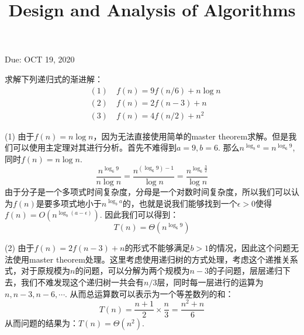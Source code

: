 \documentclass{myhw}
\title{Design and Analysis of Algorithms}
\begin{document}
\begin{center}

\vspace{0.5cm}

Due: OCT 19, 2020

\vspace{0.5cm}
\end{center}
\begin{homeworkProblem}
求解下列递归式的渐进解：
\[
\begin{split}
&(1)\quad f(n)=9f(n/6)+n\log n\\
&(2)\quad f(n)=2f(n-3)+n\\
&(3)\quad f(n)=4f(n/2)+n^2
\end{split}
\]

\end{homeworkProblem}
\begin{solution}
(1) 由于$f(n)=n\log n$，因为无法直接使用简单的master theorem求解。但是我们可以使用主定理对其进行分析。首先不难得到$a=9,b=6$. 那么$n^{\log_b a}=n^{\log_6 9}$, 同时$f(n)=n\log n$. 
\[
\frac{n^{\log_6 9}}{n\log n}=\frac{n^{(\log_6 9) -1}}{\log n}=\frac{n^{\log_6 \frac{3}{2}}}{\log n}
\]
由于分子是一个多项式时间复杂度，分母是一个对数时间复杂度，所以我们可以认为$f(n)$是要多项式地小于$n^{\log_b a}$的，也就是说我们能够找到一个$\epsilon >0$使得$f(n)=O(n^{\log_b (a-\epsilon)})$. 因此我们可以得到：
\[
T(n)=\Theta(n^{\log_6 9})
\]
\end{solution}
\begin{solution}
(2) 由于$f(n)=2f(n-3)+n$的形式不能够满足$b>1$的情况，因此这个问题无法使用master theorem处理。这里考虑使用递归树的方式处理，考虑这个递推关系式，对于原规模为$n$的问题，可以分解为两个规模为$n-3$的子问题，层层递归下去，我们不难发现这个递归树一共会有$n/3$层，同时每一层进行的运算为$n,n-3,n-6,\cdots$. 从而总运算数可以表示为一个等差数列的和：
\[
T(n)=\frac{n+1}{2}\times \frac{n}{3}=\frac{n^2+n}{6}
\]
从而问题的结果为：$T(n)=\Theta(n^2)$.
\end{solution}
\end{document}
